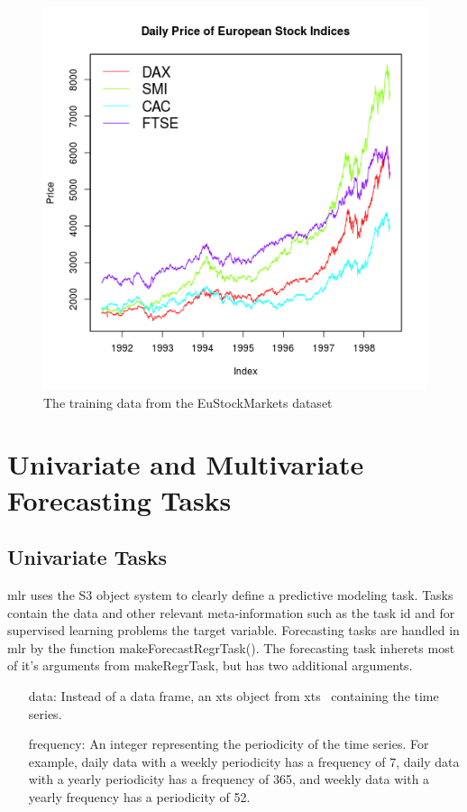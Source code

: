 \documentclass[12pt]{article}%
\makeatletter
\theoremstyle{definition}
\newcommand\code{\@codex}
\def\@codex#1{{\normalfont\ttfamily\hyphenchar\font=-1 #1}}
\newcommand{\pkg}[1]{{\fontseries{b}\selectfont #1}}
\makeatother
\begin{document}
\begin{figure}[h!]
\includegraphics[width=\linewidth]{paper_figures/plot_eu_train.png}
\centering
\caption{The training data from the EuStockMarkets dataset}
\label{fig:eu_train}
\end{figure}

\section{Univariate and Multivariate Forecasting Tasks}
\label{sec:task}

\subsection{Univariate Tasks}
\label{sec:univarTask}
\pkg{mlr} uses the S3 object system to clearly define a predictive modeling task. Tasks contain the data and other relevant meta-information such as the task id and for supervised learning problems the target variable. Forecasting tasks are handled in \pkg{mlr} by the function \code{makeForecastRegrTask()}. The forecasting task inherets most of it's arguments from \code{makeRegrTask}, but has two additional arguments.

\begin{itemize}
\item[data:] Instead of a data frame, an xts object from \pkg{xts}~\cite{xts} containing the time series.
\item[frequency:] An integer representing the periodicity of the time series. For example, daily data with a weekly periodicity has a frequency of 7, daily data with a yearly periodicity has a frequency of 365, and weekly data with a yearly frequency has a periodicity of 52.
\end{itemize}
\end{document}
